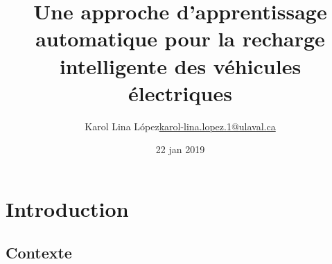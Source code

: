 \documentclass[french]{beamer}
\title[Recharge intelligente de VE]{Une approche d'apprentissage automatique pour la recharge intelligente des véhicules électriques}
\author[Karol Lina L\'opez]{\texorpdfstring{Karol Lina L\'opez\newline\href{mailto:karol-lina.lopez.1@ulaval.ca}{karol-lina.lopez.1@ulaval.ca}}{Karol Lina L\'opez}}
\date{22 jan 2019} %
\begin{document}
{
\newcommand{\abs}[1]{\left\vert#1\right\vert}
\newcommand{\argmin}{\operatornamewithlimits{argmin}}
\newcommand{\argmax}{\operatornamewithlimits{argmax}}
\newcommand{\mean}{\operatornamewithlimits{mean}}

{
\begin{frame}
\titlepage %
\end{frame}
}
\addtocounter{framenumber}{-1}

% 

% 
% 
% 


\section{Introduction}
\subsection{Contexte}

}
\end{document}
